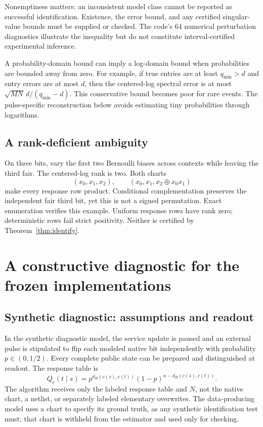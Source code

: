 \documentclass[11pt]{article}
\theoremstyle{definition}\newtheorem{definition}[theorem]{Definition}
\theoremstyle{remark}\newtheorem{remark}[theorem]{Remark}
\begin{document}
Nonemptiness matters: an inconsistent model class cannot be reported as successful identification. Existence, the error bound, and any certified singular-value bounds must be supplied or checked. The code's 64 numerical perturbation diagnostics illustrate the inequality but do not constitute interval-certified experimental inference.

A probability-domain bound can imply a log-domain bound when probabilities are bounded away from zero. For example, if true entries are at least $q_{\min}>d$ and entry errors are at most $d$, then the centered-log spectral error is at most $\sqrt{MN}\,d/(q_{\min}-d)$. This conservative bound becomes poor for rare events. The pulse-specific reconstruction below avoids estimating tiny probabilities through logarithms.

\subsection{A rank-deficient ambiguity}
On three bits, vary the first two Bernoulli biases across contexts while leaving the third fair. The centered-log rank is two. Both charts
\begin{equation}
(x_0,x_1,x_2),\qquad (x_0,x_1,x_2\oplus x_0x_1)
\end{equation}
make every response row product. Conditional complementation preserves the independent fair third bit, yet this is not a signed permutation. Exact enumeration verifies this example. Uniform response rows have rank zero; deterministic rows fail strict positivity. Neither is certified by Theorem~\ref{thm:identify}.

\section{A constructive diagnostic for the frozen implementations}
\subsection{Synthetic diagnostic: assumptions and readout}
In the synthetic diagnostic model, the service update is paused and an external pulse is stipulated to flip each modeled native bit independently with probability $p\in(0,1/2)$. Every complete public state can be prepared and distinguished at readout. The response table is
\begin{equation}
Q_c(t\mid s)=p^{d_H(c(s),c(t))}(1-p)^{n-d_H(c(s),c(t))}.\label{eq:pulse}
\end{equation}
The algorithm receives only the labeled response table and $N$, not the native chart, a netlist, or separately labeled elementary overwrites. The data-producing model uses a chart to specify its ground truth, as any synthetic identification test must; that chart is withheld from the estimator and used only for checking.
\end{document}
